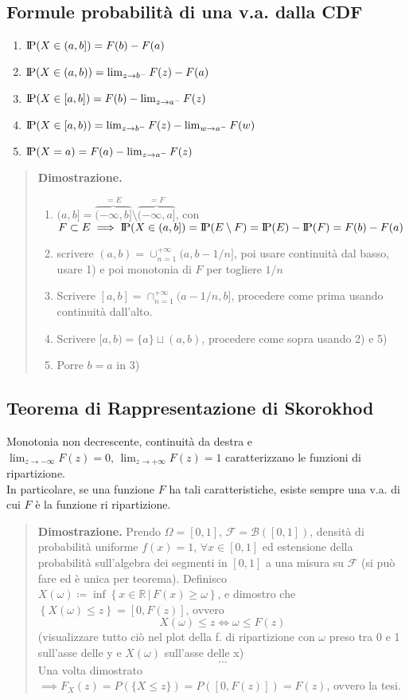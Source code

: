 \documentclass[a4paper,10pt]{article}
\newcommand{\pr}{\text{I\kern-0.15em P}} %
\theoremstyle{remark}
\theoremstyle{definition}
\newenvironment{dimo}{\begin{quote}\textbf{Dimostrazione.}}{\end{quote}} %
\begin{document}
\subsection*{Formule probabilità di una v.a. dalla CDF}
\begin{enumerate}
    \item $\pr(X\in(a,b])=F(b)-F(a)$
    \item $\pr(X\in(a,b))=\lim_{z\to b^-}F(z)-F(a)$
    \item $\pr(X\in[a,b])=F(b)-\lim_{z\to a^-}F(z)$
    \item $\pr(X\in[a,b))=\lim_{z\to b^-}F(z)-\lim_{w\to a^-}F(w)$
    \item $\pr(X= a)=F(a)-\lim_{z\to a^-}F(z)$
\end{enumerate}
\begin{dimo}
    \begin{enumerate}
        \item $(a,b]=\overbrace{(-\infty,b]}^{=E}\setminus\overbrace{(-\infty, a]}^{=F}$, con $F\subset E \implies\pr(X\in(a,b])=\pr(E\setminus F)=\pr(E)-\pr(F)=F(b)-F(a)$
        \item scrivere $(a,b)=\cup_{n=1}^{+\infty}(a,b-1/n]$, poi usare continuità dal basso, usare 1) e poi monotonia di $F$ per togliere $1/n$
        \item Scrivere $[a,b]=  \cap_{n=1}^{+\infty}(a-1/n,b]$, procedere come prima usando continuità dall'alto.
        \item Scrivere $[a,b)=\{a\}\sqcup(a,b)$, procedere come sopra usando 2) e 5)
        \item Porre $b=a$ in 3)
    \end{enumerate}
\end{dimo}

\subsection*{Teorema di Rappresentazione di Skorokhod}
Monotonia non decrescente, continuità da destra e $\lim_{z\rightarrow-\infty}F\left(z\right)=0,\,\lim_{z\rightarrow+\infty}F\left(z\right)=1$
caratterizzano le funzioni di ripartizione. \\
In particolare, se una funzione $F$ ha tali caratteristiche, esiste sempre una v.a. di cui $F$ è la funzione ri ripartizione.

\begin{dimo}
    Prendo $\Omega=\left[0,1\right],\,\mathcal{F}=\mathcal{B}\left(\left[0,1\right]\right)$,
densità di probabilità uniforme $f\left(x\right)=1,\,\forall x\in\left[0,1\right]$
ed estensione della probabilità sull'algebra dei segmenti in $[0,1]$ a una misura su $\mathcal{F}$ (si può fare ed è unica per teorema). Definisco
$X\left(\omega\right)\coloneqq\inf\left\{ x\in\mathbb{R}\,|\,F\left(x\right)\geq\omega\right\} $,
e dimostro che $\left\{ X(\omega)\leq z\right\} =\left[0,F\left(z\right)\right]$, ovvero
$$X(\omega)\le z \iff \omega \le F(z)$$
(visualizzare tutto ciò nel plot della f. di ripartizione con $\omega$ preso tra 0 e 1 sull'asse delle y e $X(\omega)$ sull'asse delle x) 
$$\dots$$
Una volta dimostrato $\implies F_X(z)=P(\{X\le z\})=P([0,F(z)])=F(z)$, ovvero la tesi.
\end{dimo}
\end{document}
